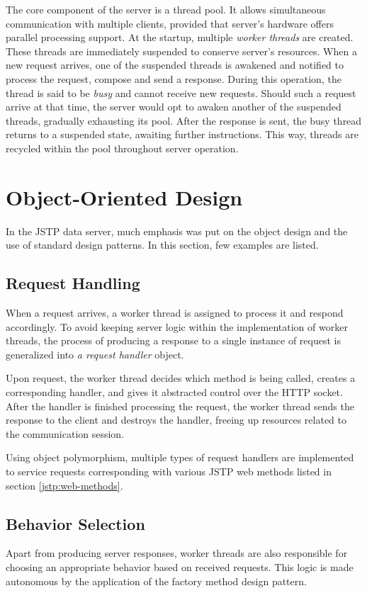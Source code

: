The core component of the server is a thread pool. It allows simultaneous communication with multiple clients, provided that server's hardware offers parallel processing support. At the startup, multiple \textit{worker threads} are created. These threads are immediately suspended to conserve server's resources. When a new request arrives, one of the suspended threads is awakened and notified to process the request, compose and send a response. During this operation, the thread is said to be \textit{busy} and cannot receive new requests. Should such a request arrive at that time, the server would opt to awaken another of the suspended threads, gradually exhausting its pool. After the response is sent, the busy thread returns to a suspended state, awaiting further instructions. This way, threads are recycled within the pool throughout server operation.

\section{Object-Oriented Design}
In the JSTP data server, much emphasis was put on the object design and the use of standard design patterns. In this section, few examples are listed.

\subsection{Request Handling}
When a request arrives, a worker thread is assigned to process it and respond accordingly. To avoid keeping server logic within the implementation of worker threads, the process of producing a response to a single instance of request is generalized into \textit{a request handler} object.

Upon request, the worker thread decides which method is being called, creates a corresponding handler, and gives it abstracted control over the HTTP socket. After the handler is finished processing the request, the worker thread sends the response to the client and destroys the handler, freeing up resources related to the communication session.

Using object polymorphism, multiple types of request handlers are implemented to service requests corresponding with various JSTP web methods listed in section \ref{jstp:web-methods}.

\subsection{Behavior Selection}
Apart from producing server responses, worker threads are also responsible for choosing an appropriate behavior based on received requests. This logic is made autonomous by the application of the factory method design pattern.

